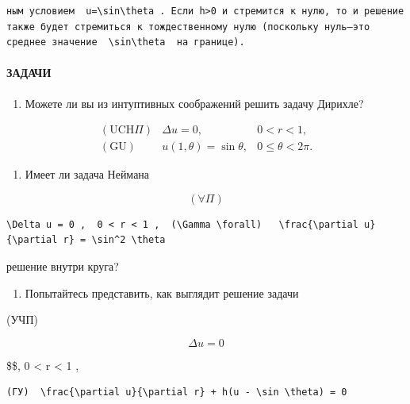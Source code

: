 \documentclass[
  ukrainian,
]{article}
\providecommand{\tightlist}{%
  \setlength{\itemsep}{0pt}\setlength{\parskip}{0pt}}
\begin{document}
\begin{verbatim}
ным условием  u=\sin\theta . Если h>0 и стремится к нулю, то и решение также будет стремиться к тождественному нулю (поскольку нуль—это среднее значение  \sin\theta  на границе).
\end{verbatim}

\paragraph{ЗАДАЧИ}\label{ux437ux430ux434ux430ux447ux438-7}

\begin{enumerate}
\def\labelenumi{\arabic{enumi}.}
\tightlist
\item
  Можете ли вы из интуптивных соображений решить задачу Дирихле?
\end{enumerate}

\[
\begin{array}{ll} (\text{UCH}\Pi) & \Delta u = 0, & 0 < r < 1, \\ (\text{GU}) & u(1, \theta) = \sin \theta, & 0 \leqslant \theta < 2\pi. \end{array}
\]

\begin{enumerate}
\def\labelenumi{\arabic{enumi}.}
\setcounter{enumi}{1}
\tightlist
\item
  Имеет ли задача Неймана
\end{enumerate}

\[
(\forall \Pi)
\]

\begin{verbatim}
\Delta u = 0 ,  0 < r < 1 ,  (\Gamma \forall)   \frac{\partial u}{\partial r} = \sin^2 \theta
\end{verbatim}

решение внутри круга?

\begin{enumerate}
\def\labelenumi{\arabic{enumi}.}
\setcounter{enumi}{2}
\tightlist
\item
  Попытайтесь представить, как выглядит решение задачи
\end{enumerate}

(УЧП)

\[
\Delta u = 0
\]

\$\$, 0 \textless{} r \textless{} 1 ,

\begin{verbatim}
(ГУ)  \frac{\partial u}{\partial r} + h(u - \sin \theta) = 0
\end{verbatim}
\end{document}
